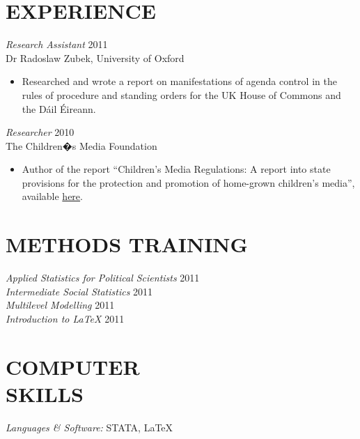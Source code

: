 \documentclass[line,margin]{res}
\begin{document}
\begin{resume}
\section{EXPERIENCE} {\sl Research Assistant} \hfill 2011 \\
                Dr Radoslaw Zubek, University of Oxford
                 \begin{itemize}  \itemsep -2pt %
                 \item Researched and wrote a report on manifestations of agenda control in the rules of procedure and standing orders for the UK House of Commons and the D\'{a}il \'{E}ireann.            
                \end{itemize}
 
                {\sl Researcher} \hfill            2010 \\
                The Children�s Media Foundation 
                 \begin{itemize}  \itemsep -2pt %
                 \item Author of the report ``Children's Media Regulations: A report into state provisions for the protection and promotion of home-grown children's media'', available \href{''http://www.google.co.uk/url?sa=t&rct=j&q=jack%20blumenau%20childrens%20media&source=web&cd=1&ved=0CCMQFjAA&url=http%3A%2F%2Fwww.savekidstv.org.uk%2Fwp-content%2Fuploads%2F2011%2F05%2FSKTV-competitor-territory-research-post-final-updated-24.4.11.pdf&ei=XPl2UObTC6Sa0QXsjYDoAg&usg=AFQjCNGCnDm4k8REB2NhQWQAXA1Ju7DWvw''}{here}.
                 \end{itemize} 
				
\section{METHODS TRAINING}	{\sl Applied Statistics for Political Scientists} \hfill 2011 \\			
 {\sl Intermediate Social Statistics} \hfill 2011 \\
{\sl Multilevel Modelling} \hfill 2011 \\
{\sl Introduction to \LaTeX} \hfill 2011

\section{COMPUTER \\ SKILLS} {\sl Languages \& Software:} STATA, \LaTeX \\
               

\end{resume}
\end{document}
